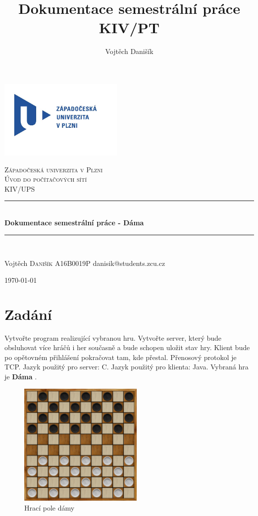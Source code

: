 \documentclass[12pt, a4paper]{article}
\title{\textbf{Dokumentace semestrální práce} \\KIV/PT}
\author{Vojtěch Danišík}
\begin{document}
\begin{titlepage} 
	\newcommand{\HRule}{\rule{\linewidth}{0.5mm}} 
	\begin{center}
	\includegraphics[width=6cm]{img/logo}\\
	\end{center}
	\textsc{\LARGE Západočeská univerzita v Plzni}\\[1.5cm] 	
	\textsc{\Large Úvod do počítačových sítí}\\[0.5cm] 
	\textsc{\large KIV/UPS}\\[0.5cm] 
	\HRule\\[0.4cm]
	{\LARGE\bfseries Dokumentace semestrální práce - Dáma}\\[0.4cm] 
	\HRule\\[1.5cm]

	\begin{minipage}{0.4\textwidth}
		\begin{flushleft}
			\large
			Vojtěch \textsc{Danišík}\newline
			A16B0019P\newline
			danisik@students.zcu.cz
		\end{flushleft}
	\end{minipage}
	\vfill\vfill\vfill
	\begin{flushright}
	{\large\today}
	\end{flushright}
	\vfill 
\end{titlepage}
\newpage
\tableofcontents
\newpage
\section{Zadání}
Vytvořte program realizující vybranou hru. Vytvořte  server, který bude obsluhovat více hráčů i her současně a bude schopen uložit stav
hry. Klient bude po opětovném přihlášení pokračovat tam, kde přestal. Přenosový protokol je TCP. Jazyk použitý pro server: C. 
Jazyk použitý pro klienta: Java. Vybraná hra je \textbf{Dáma} .
\begin {figure}[h]
\centering
\includegraphics[width=6cm]{img/draughts_example}
\caption{Hrací pole dámy}
\label{fig:draughts_example}
\end {figure}
\end{document}
